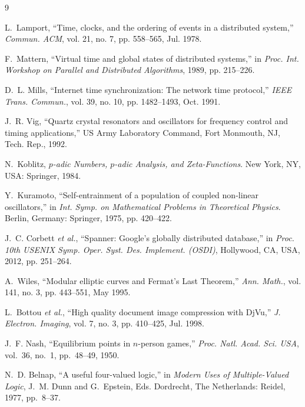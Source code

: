 \documentclass[conference]{IEEEtran}
\begin{document}

\begin{thebibliography}{9}

L.~Lamport, ``Time, clocks, and the ordering of events in a distributed system,'' \emph{Commun. ACM}, vol. 21, no. 7, pp. 558--565, Jul. 1978.

F.~Mattern, ``Virtual time and global states of distributed systems,'' in \emph{Proc. Int. Workshop on Parallel and Distributed Algorithms}, 1989, pp. 215--226.

D.~L. Mills, ``Internet time synchronization: The network time protocol,'' \emph{IEEE Trans. Commun.}, vol. 39, no. 10, pp. 1482--1493, Oct. 1991.

J.~R. Vig, ``Quartz crystal resonators and oscillators for frequency control and timing applications,'' US Army Laboratory Command, Fort Monmouth, NJ, Tech. Rep., 1992.

N.~Koblitz, \emph{$p$-adic Numbers, $p$-adic Analysis, and Zeta-Functions}. New York, NY, USA: Springer, 1984.

Y.~Kuramoto, ``Self-entrainment of a population of coupled non-linear oscillators,'' in \emph{Int. Symp. on Mathematical Problems in Theoretical Physics}. Berlin, Germany: Springer, 1975, pp. 420--422.

J.~C. Corbett \emph{et al.}, ``Spanner: Google's globally distributed database,'' in \emph{Proc. 10th USENIX Symp. Oper. Syst. Des. Implement. (OSDI)}, Hollywood, CA, USA, 2012, pp. 251--264.

A.~Wiles, ``Modular elliptic curves and Fermat's Last Theorem,'' \emph{Ann. Math.}, vol. 141, no. 3, pp. 443--551, May 1995.

L.~Bottou \emph{et al.}, ``High quality document image compression with DjVu,'' \emph{J. Electron. Imaging}, vol. 7, no. 3, pp. 410--425, Jul. 1998.

J.~F. Nash, ``Equilibrium points in $n$-person games,'' \emph{Proc. Natl. Acad. Sci. USA}, 
vol.~36, no.~1, pp.~48--49, 1950.

N.~D. Belnap, ``A useful four-valued logic,'' in \emph{Modern Uses of Multiple-Valued Logic}, 
J.~M. Dunn and G.~Epstein, Eds. Dordrecht, The Netherlands: Reidel, 1977, pp.~8--37.

\end{thebibliography}
\end{document}

